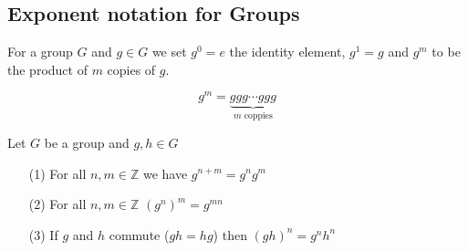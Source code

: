 \documentclass[16pt,a4paper]{article}
\theoremstyle{definition}
\begin{document}
\newpage


\subsection{Exponent notation for Groups}

For a group $G$ and $g\in G$ we set $g^0 = e$ the identity element, $g^1 =g$ and $g^m$ to be the product of $m$ copies of $g$. 

\[g^m = \underbrace{ggg\cdots ggg}_{\text{$m$ coppies}}\]


\begin{thm}{}{}
Let $G$ be a group and $g,h\in G$
\begin{itemize}
\item[(1)] For all $n,m \in \mathbb{Z}$ we have $g^{n+m} = g^n g^m$
\item[(2)] For all $n,m \in \mathbb{Z}$ $(g^n)^m = g^{mn}$
\item[(3)] If $g$ and $h$ commute ($gh = hg$) then $(gh)^n = g^nh^n$

\end{itemize}
\end{thm}
\end{document}
